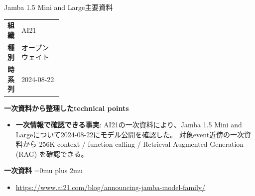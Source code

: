 \begin{technicalnote}{Jamba 1.5 Mini and Large}{主要資料}
\begingroup
\begin{tabularx}{\linewidth}{@{}>{\bfseries}p{0.22\linewidth}X@{}}
組織 & AI21 \\
種別 & オープンウェイト \\
時系列 & 2024-08-22 \\
\end{tabularx}
\smallskip
{\bfseries 一次資料から整理したtechnical points}
\begin{itemize}[leftmargin=1.5em,itemsep=0.35em]
\item \textbf{一次情報で確認できる事実}: AI21の一次資料により、Jamba 1.5 Mini and Largeについて2024-08-22にモデル公開を確認した。 対象event近傍の一次資料から 256K context / function calling / Retrieval-Augmented Generation (RAG) を確認できる。
\end{itemize}
\begin{minipage}{\linewidth}
\begin{samepage}
{\bfseries 一次資料}
\begingroup\sloppy
\Urlmuskip=0mu plus 2mu\relax
\begin{itemize}[leftmargin=1.5em,itemsep=0.25em]
\item {\scriptsize\url{https://www.ai21.com/blog/announcing-jamba-model-family/}}
\end{itemize}
\endgroup
\end{samepage}
\end{minipage}
\endgroup
\end{technicalnote}
\medskip

